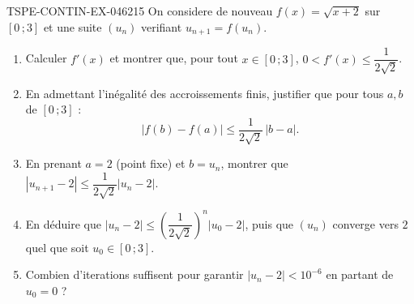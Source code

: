\begin{exercice}{TSPE-CONTIN-EX-046}{2}{15}
On considere de nouveau $f(x) = \sqrt{x+2}$ sur $[0\,;3]$ et une suite $(u_n)$ verifiant $u_{n+1} = f(u_n)$.

\begin{enumerate}
  \item Calculer $f'(x)$ et montrer que, pour tout $x \in [0\,;3]$, $0 < f'(x) \leq \dfrac{1}{2\sqrt2}$.
  \item En admettant l'inégalité des accroissements finis, justifier que pour tous $a, b$ de $[0\,;3]$ :
  \[ \left|f(b) - f(a)\right| \leq \frac{1}{2\sqrt2}\,\left|b - a\right|. \]
  \item En prenant $a = 2$ (point fixe) et $b = u_n$, montrer que $\left|u_{n+1} - 2\right| \leq \dfrac{1}{2\sqrt2}\left|u_n - 2\right|$.
  \item En déduire que $\left|u_n - 2\right| \leq \left(\dfrac{1}{2\sqrt2}\right)^{n}\left|u_0 - 2\right|$, puis que $(u_n)$ converge vers $2$ quel que soit $u_0 \in [0\,;3]$.
  \item Combien d'iterations suffisent pour garantir $\left|u_n - 2\right| < 10^{-6}$ en partant de $u_0 = 0$ ?
\end{enumerate}
\end{exercice}
